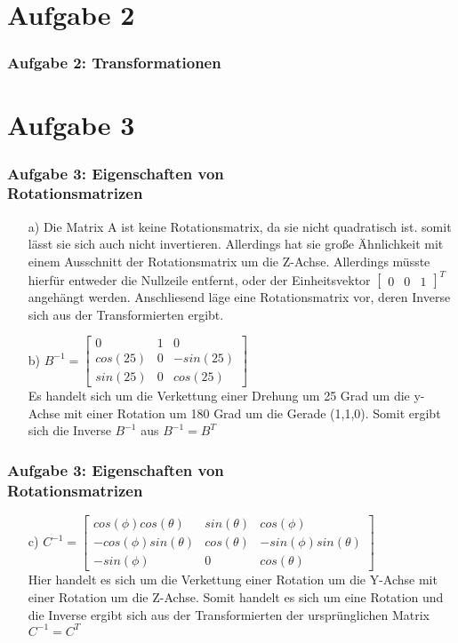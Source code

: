 \documentclass[accentcolor=tud9c,colorbacktitle,inverttitle,landscape,german,presentation,t]{tudbeamer}
\begin{document}
\section{Aufgabe 2}
\begin{frame}
	\frametitle{Aufgabe 2: Transformationen}
\end{frame}

\section{Aufgabe 3}
\begin{frame}
	\frametitle{Aufgabe 3: Eigenschaften von \\ Rotationsmatrizen} 
	\begin{itemize}
		\item[a)] Die Matrix A ist keine Rotationsmatrix, da sie nicht quadratisch ist. somit lässt sie sich auch nicht invertieren. Allerdings hat sie große Ähnlichkeit mit einem Ausschnitt der Rotationsmatrix um die Z-Achse. Allerdings müsste hierfür entweder die Nullzeile entfernt, oder der Einheitsvektor $\begin{bmatrix} 0 & 0 & 1\end{bmatrix}^T$angehängt werden. Anschliesend läge eine Rotationsmatrix vor, deren Inverse sich aus der Transformierten ergibt.%
		\item[b)] $B^{-1}=\begin{bmatrix}
		0 & 1 & 0\\
		cos(25) & 0 & -sin(25)\\
		sin(25) & 0 & cos(25)
		\end{bmatrix} $ \\
		Es handelt sich um die Verkettung einer Drehung um 25 Grad um die y-Achse mit einer Rotation um 180 Grad um die Gerade (1,1,0). Somit ergibt sich die Inverse $B^{-1}$ aus $B^{-1}=B^{T} $
	\end{itemize}
\end{frame}

\begin{frame}
	\frametitle{Aufgabe 3: Eigenschaften von \\ Rotationsmatrizen} 
	\begin{itemize}
		\item[c)] $C^{-1}=\begin{bmatrix}
		cos(\phi)cos(\theta) & sin(\theta) & cos(\phi)\\
		-cos(\phi)sin(\theta) & cos(\theta) & -sin(\phi)sin(\theta) \\
		-sin(\phi) & 0 & cos(\theta) 
		\end{bmatrix} $ \\
		Hier handelt es sich um die Verkettung einer Rotation um die Y-Achse mit einer Rotation um die Z-Achse. Somit handelt es sich um eine Rotation und die Inverse ergibt sich aus der Transformierten der ursprünglichen Matrix $C^{-1}=C^T$
	\end{itemize}
\end{frame}
\end{document}
